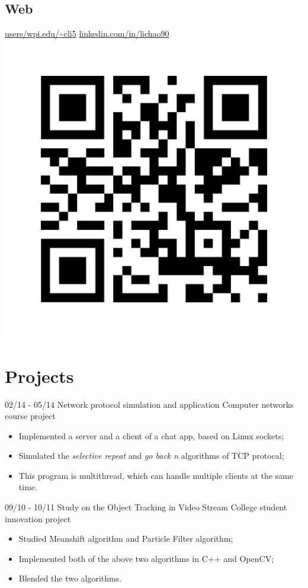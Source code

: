 \documentclass[]{friggeri-cv}
\begin{document}
\begin{aside}
	\section{Web}
	\href{http://users.wpi.edu/~cli5}{users/wpi.edu/\textasciitilde cli5}
	\href{https://www.linkedin.com/in/lichao90}{linkedin.com/in/lichao90}
	\includegraphics[scale=0.05]{img/Chao_Li.png}
\end{aside}

\section{Projects}
\begin{entrylist}
	\entry
	{02/14 - 05/14}
	{Network protocol simulation and application}
	{Computer networks course project}
	{
		\vspace{-3mm}
		\begin{itemize}
			\item Implemented a server and a client of a chat app, based on Linux
				sockets;
			\item Simulated the \emph{selective repeat} and \emph{go back n}
				algorithms of TCP protocal;
			\item This program is multithread, which can handle multiple clients at
				the same time.
		\end{itemize}
	}
	\entry
	{09/10 - 10/11}
	{Study on the Object Tracking in Video Stream}
	{College student innovation project}
	{
		\vspace{-3mm}
		\begin{itemize}
			\item Studied Meanshift algorithm and Particle Filter algorithm;
			\item Implemented both of the above two algorithms in C++ and OpenCV;
			\item Blended the two algorithms.
		\end{itemize}
	}
\end{entrylist}
\end{document}

